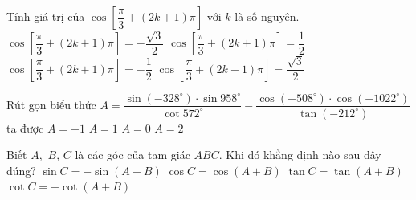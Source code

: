 \begin{ex}%
	Tính giá trị của  $\cos \left[\dfrac{\pi }{3}+\left( 2k+1 \right)\pi \right]$ với $k$ là số nguyên.
	 \choice
		{$\cos \left[\dfrac{\pi  }{3}+\left( 2k+1 \right)\pi \right]=-\dfrac{\sqrt{3}}{2}$}
		{$\cos \left[\dfrac{\pi }{3}+\left( 2k+1 \right)\pi  \right]=\dfrac{1}{2}$}
		{\True $\cos \left[\dfrac{\pi  }{3}+\left( 2k+1 \right)\pi \right]=-\dfrac{1}{2}$}
		{$\cos \left[\dfrac{\pi }{3}+\left( 2k+1 \right)\pi  \right]=\dfrac{\sqrt{3}}{2}$}
\end{ex}

\begin{ex}%
	Rút gọn biểu thức $A=\dfrac{\sin\left(-328^\circ\right)\cdot \sin{958^\circ}}{\cot 572^\circ  }-\dfrac{\cos\left(-508^\circ\right)\cdot \cos\left(-1022^\circ\right)}{\tan\left(-212^\circ\right)}$ ta được
	\choice 
		 {\True $A=-1$}
		 {$A= 1$}
		{$A= 0$} 
		 {$A= 2$}
\end{ex}

\begin{ex}%
	Biết $A,$ $B$, $C$ là các góc của tam giác $ABC$. Khi  đó khẳng định nào sau đây đúng?
	 \choice
		{$\sin C=-\sin \left(A+B\right)$} 
		{$\cos C=\cos  \left(A+B\right)$}
		{$\tan C=\tan \left(A+B\right)$} 
		{\True $\cot  C=-\cot \left(A+B\right)$}
\end{ex}

